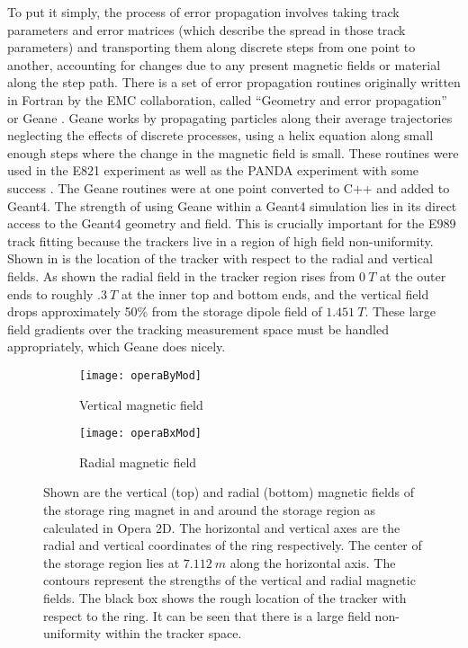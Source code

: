 To put it simply, the process of error propagation involves taking track parameters and error matrices (which describe the spread in those track parameters) and transporting them along discrete steps from one point to another, accounting for changes due to any present magnetic fields or material along the step path. There is a set of error propagation routines originally written in Fortran by the EMC collaboration, called ``Geometry and error propagation'' or Geane \cite{geanemanual}. Geane works by propagating particles along their average trajectories neglecting the effects of discrete processes, using a helix equation along small enough steps where the change in the magnetic field is small. These routines were used in the E821 experiment as well as the PANDA experiment with some success \cite{Lavezzi}. The Geane routines were at one point converted to C++ and added to Geant4. The strength of using Geane within a Geant4 simulation lies in its direct access to the Geant4 geometry and field. This is crucially important for the E989 track fitting because the trackers live in a region of high field non-uniformity. Shown in  is the location of the tracker with respect to the radial and vertical fields. As shown the radial field in the tracker region rises from $\SI{0}{T}$ at the outer ends to roughly $\SI{.3}{T}$ at the inner top and bottom ends, and the vertical field drops approximately 50\% from the storage dipole field of $\SI{1.451}{T}$. These large field gradients over the tracking measurement space must be handled appropriately, which Geane does nicely.



\begin{figure}[]
\centering
    \begin{subfigure}[]{0.75\textwidth}
        \centering
        \texttt{[image: operaByMod]}
        \caption{Vertical magnetic field}
    \label{fig:operaBy}
    \end{subfigure}%
    \vspace{5mm}
    \begin{subfigure}[]{0.75\textwidth}
        \centering
        \texttt{[image: operaBxMod]}
        \caption{Radial magnetic field}
    \label{fig:operaBx}
    \end{subfigure}
\caption[Vertical and radial magnetic fields calculated in Opera2D]{Shown are the vertical (top) and radial (bottom) magnetic fields of the storage ring magnet in and around the storage region as calculated in Opera 2D. The horizontal and vertical axes are the radial and vertical coordinates of the ring respectively. The center of the storage region lies at $\SI{7.112}{m}$ along the horizontal axis. The contours represent the strengths of the vertical and radial magnetic fields. The black box shows the rough location of the tracker with respect to the ring. It can be seen that there is a large field non-uniformity within the tracker space.}
\label{fig:Opera2DFields}
\end{figure}


